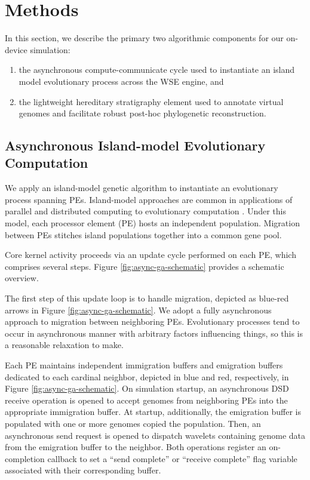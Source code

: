 \section{Methods} \label{sec:methods}

In this section, we describe the primary two algorithmic components for our on-device simulation:
\begin{enumerate}
\item the asynchronous compute-communicate cycle used to instantiate an island model evolutionary process across the WSE engine, and
\item the lightweight hereditary stratigraphy element used to annotate virtual genomes and facilitate robust post-hoc phylogenetic reconstruction.
\end{enumerate}

\subsection{Asynchronous Island-model Evolutionary Computation}

We apply an island-model genetic algorithm to instantiate an evolutionary process spanning PEs.
Island-model approaches are common in applications of parallel and distributed computing to evolutionary computation \citep{kozaTODO}.
Under this model, each processor element (PE) hosts an independent population.
Migration between PEs stitches island populations together into a common gene pool.



Core kernel activity proceeds via an update cycle performed on each PE, which comprises several steps.
Figure \ref{fig:async-ga-schematic} provides a schematic overview.

The first step of this update loop is to handle migration, depicted as blue-red arrows in Figure \ref{fig:async-ga-schematic}.
We adopt a fully asynchronous approach to migration between neighboring PEs.
Evolutionary processes tend to occur in asynchronous manner with arbitrary factors influencing things, so this is a reasonable relaxation to make.

Each PE maintains independent immigration buffers and emigration buffers dedicated to each cardinal neighbor, depicted in blue and red, respectively, in Figure \ref{fig:async-ga-schematic}.
On simulation startup, an asynchronous DSD receive operation is opened to accept genomes from neighboring PEs into the appropriate immigration buffer.
At startup, additionally, the emigration buffer is populated with one or more genomes copied the population.
Then, an asynchronous send request is opened to dispatch wavelets containing genome data from the emigration buffer to the neighbor.
Both operations register an on-completion callback to set a ``send complete'' or ``receive complete'' flag variable associated with their corresponding buffer.

